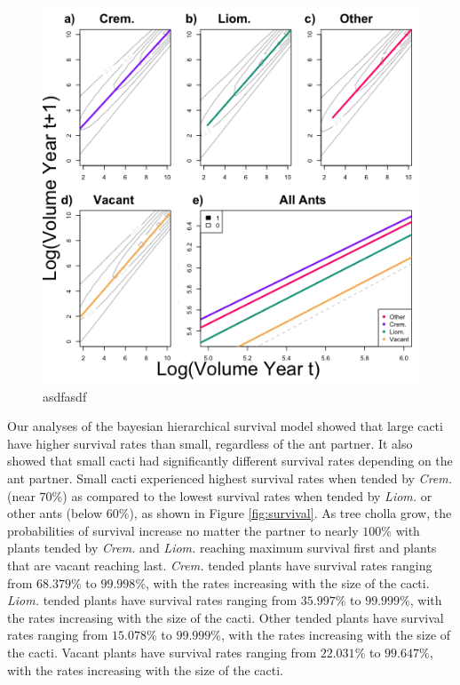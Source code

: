 \documentclass[12pt,a4paper]{article}
\begin{document}
\begin{figure}[h]
	\includegraphics[width=.5\linewidth]{grow_contour_lines_color.png}
	\caption{asdfasdf}
	\label{fig:growth}
\end{figure}

Our analyses of the bayesian hierarchical survival model showed that large cacti have higher survival rates than small, regardless of the ant partner. 
It also showed that small cacti had significantly different survival rates depending on the ant partner. 
Small cacti experienced highest survival rates when tended by \textit{Crem.} (near $70\%$) as compared to the lowest survival rates when tended by \textit{Liom.} or other ants (below $60\%$), as shown in Figure \ref{fig:survival}.
As tree cholla grow, the probabilities of survival increase no matter the partner to nearly $100\%$ with plants tended by \textit{Crem.} and \textit{Liom.} reaching maximum survival first and plants that are vacant reaching last. 
\textit{Crem.} tended plants have survival rates ranging from $68.379\%$ to $99.998\%$, with the rates increasing with the size of the cacti.  
\textit{Liom.} tended plants have survival rates ranging from $35.997\%$ to $99.999\%$, with the rates increasing with the size of the cacti. 
Other tended plants have survival rates ranging from $15.078\%$ to $99.999\%$, with the rates increasing with the size of the cacti. 
Vacant plants have survival rates ranging from $22.031\%$ to $99.647\%$, with the rates increasing with the size of the cacti. 
\end{document}
